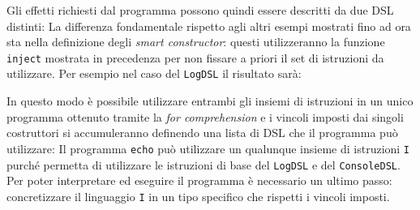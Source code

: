 Gli effetti richiesti dal programma possono quindi essere descritti da due DSL distinti:
La differenza fondamentale rispetto agli altri esempi mostrati fino ad ora sta nella definizione degli \emph{smart constructor}: questi utilizzeranno la funzione \lstinline{inject} mostrata in precedenza per non fissare a priori il set di istruzioni da utilizzare. Per esempio nel caso del \lstinline{LogDSL} il risultato sarà:

In questo modo è possibile utilizzare entrambi gli insiemi di istruzioni in un unico programma ottenuto tramite la \emph{for comprehension} e i vincoli imposti dai singoli costruttori si accumuleranno definendo una lista di DSL che il programma può utilizzare:
Il programma \lstinline{echo} può utilizzare un qualunque insieme di istruzioni \lstinline{I} purché permetta di utilizzare le istruzioni di base del \lstinline{LogDSL} e del \lstinline{ConsoleDSL}. Per poter interpretare ed eseguire il programma è necessario un ultimo passo: concretizzare il linguaggio \lstinline{I} in un tipo specifico che rispetti i vincoli imposti.

